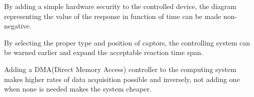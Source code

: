 \documentclass[../main.tex]{subfiles}
\begin{document}
\begin{exmp}
By adding a simple hardware security to the controlled device, the diagram representing the value of the response in function of time can be made non-negative.
\end{exmp}

\begin{exmp}
By selecting the proper type and position of captors, the controlling system can be warned earlier and expand the acceptable reaction time span.
\end{exmp}

\begin{exmp}
Adding a DMA(Direct Memory Access) controller to the computing system makes higher rates of data acquisition possible and inversely, not adding one when none is needed makes the system cheaper.
\end{exmp}
\end{document}
